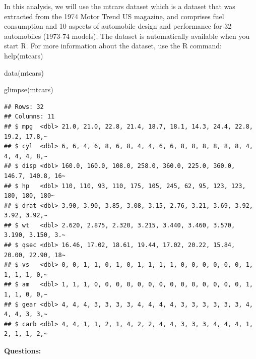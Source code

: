 \documentclass[
]{book}
\newenvironment{Shaded}{\begin{snugshade}}{\end{snugshade}}
\newcommand{\FunctionTok}[1]{\textcolor[rgb]{0.00,0.00,0.00}{#1}}
\newcommand{\NormalTok}[1]{#1}
\theoremstyle{definition}
\theoremstyle{definition}
\theoremstyle{definition}
\theoremstyle{definition}
\theoremstyle{remark}
\begin{document}
In this analysis, we will use the mtcars dataset which is a dataset that was extracted from the 1974 Motor Trend US magazine, and comprises fuel consumption and 10 aspects of automobile design and performance for 32 automobiles (1973-74 models). The dataset is automatically available when you start R. For more information about the dataset, use the R command: help(mtcars)

\begin{Shaded}
\begin{Highlighting}[]
\FunctionTok{data}\NormalTok{(mtcars)}

\FunctionTok{glimpse}\NormalTok{(mtcars)}
\end{Highlighting}
\end{Shaded}

\begin{verbatim}
## Rows: 32
## Columns: 11
## $ mpg  <dbl> 21.0, 21.0, 22.8, 21.4, 18.7, 18.1, 14.3, 24.4, 22.8, 19.2, 17.8,~
## $ cyl  <dbl> 6, 6, 4, 6, 8, 6, 8, 4, 4, 6, 6, 8, 8, 8, 8, 8, 8, 4, 4, 4, 4, 8,~
## $ disp <dbl> 160.0, 160.0, 108.0, 258.0, 360.0, 225.0, 360.0, 146.7, 140.8, 16~
## $ hp   <dbl> 110, 110, 93, 110, 175, 105, 245, 62, 95, 123, 123, 180, 180, 180~
## $ drat <dbl> 3.90, 3.90, 3.85, 3.08, 3.15, 2.76, 3.21, 3.69, 3.92, 3.92, 3.92,~
## $ wt   <dbl> 2.620, 2.875, 2.320, 3.215, 3.440, 3.460, 3.570, 3.190, 3.150, 3.~
## $ qsec <dbl> 16.46, 17.02, 18.61, 19.44, 17.02, 20.22, 15.84, 20.00, 22.90, 18~
## $ vs   <dbl> 0, 0, 1, 1, 0, 1, 0, 1, 1, 1, 1, 0, 0, 0, 0, 0, 0, 1, 1, 1, 1, 0,~
## $ am   <dbl> 1, 1, 1, 0, 0, 0, 0, 0, 0, 0, 0, 0, 0, 0, 0, 0, 0, 1, 1, 1, 0, 0,~
## $ gear <dbl> 4, 4, 4, 3, 3, 3, 3, 4, 4, 4, 4, 3, 3, 3, 3, 3, 3, 4, 4, 4, 3, 3,~
## $ carb <dbl> 4, 4, 1, 1, 2, 1, 4, 2, 2, 4, 4, 3, 3, 3, 4, 4, 4, 1, 2, 1, 1, 2,~
\end{verbatim}

\textbf{Questions:}
\end{document}
